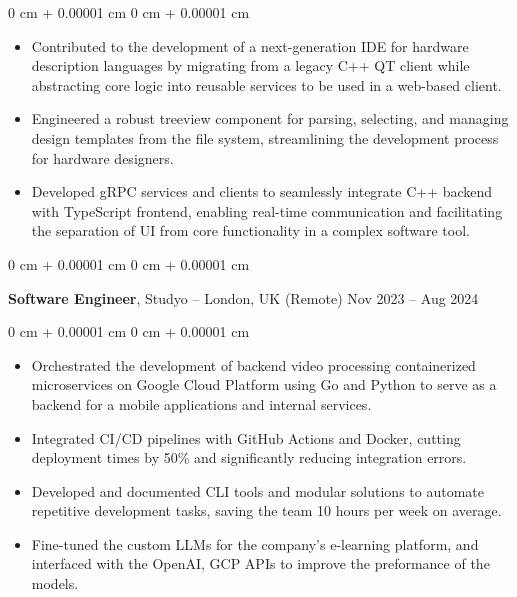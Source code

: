 \documentclass[10pt, letterpaper]{article}
\newenvironment{highlights}{
    \begin{itemize}[
        topsep=0.10 cm,
        parsep=0.10 cm,
        partopsep=0pt,
        itemsep=0pt,
        leftmargin=0 cm + 10pt
    ]
}{
    \end{itemize}
} %
\newenvironment{onecolentry}{
    \begin{adjustwidth}{
        0 cm + 0.00001 cm
    }{
        0 cm + 0.00001 cm
    }
}{
    \end{adjustwidth}
} %
\newenvironment{twocolentry}[2][]{
    \onecolentry
    \def\secondColumn{#2}
    \setcolumnwidth{\fill, 4.5 cm}
    \begin{paracol}{2}
}{
    \switchcolumn \raggedleft \secondColumn
    \end{paracol}
    \endonecolentry
} %
\begin{document}
\vspace{0.10 cm}
\begin{onecolentry}
    \begin{highlights}
        \item Contributed to the development of a next-generation IDE for hardware description languages by migrating from a legacy C++ QT client while abstracting core logic into reusable services to be used in a web-based client.

        \item Engineered a robust treeview component for parsing, selecting, and managing design templates from the file system, streamlining the development process for hardware designers.
        \item Developed gRPC services and clients to seamlessly integrate C++ backend with TypeScript frontend, enabling real-time communication and facilitating the separation of UI from core functionality in a complex software tool.

    \end{highlights}
\end{onecolentry}


\vspace{0.4 cm}

\begin{twocolentry}{
        Nov 2023 – Aug 2024
    }
    \textbf{Software Engineer}, Studyo -- London, UK (Remote)\end{twocolentry}

\vspace{0.10 cm}
\begin{onecolentry}
    \begin{highlights}
        \item Orchestrated the development of backend video processing containerized microservices on Google Cloud Platform using Go and Python to serve as a backend for a mobile applications and internal services.
        \item Integrated CI/CD pipelines with GitHub Actions and Docker, cutting deployment times by 50\% and significantly reducing integration errors.
        \item Developed and documented CLI tools and modular solutions to automate repetitive development tasks, saving the team 10 hours per week on average.
        \item Fine-tuned the custom LLMs for the company's e-learning platform, and interfaced with the OpenAI, GCP APIs to improve the preformance of the models.
    \end{highlights}
\end{onecolentry}
\end{document}
